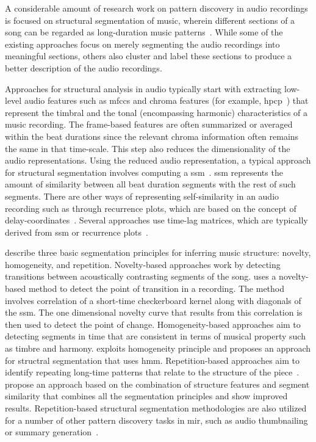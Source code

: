 A considerable amount of research work on pattern discovery in audio recordings is focused on structural segmentation of music, wherein different sections of a song can be regarded as long-duration music patterns~\citep{paulus2010state}. While some of the existing approaches focus on merely segmenting the audio recordings into meaningful sections, others also cluster and label these sections to produce a better description of the audio recordings. 

Approaches for structural analysis in audio typically start with extracting low-level audio features such as \glspl{mfcc} and chroma features (for example, \gls{hpcp}~\citep{gomez2006tonal}) that represent the timbral and the tonal (encompassing harmonic) characteristics of a music recording. The frame-based features are often summarized or averaged within the beat durations since the relevant chroma information often remains the same in that time-scale. This step also reduces the dimensionality of the audio representations. Using the reduced audio representation, a typical approach for structural segmentation involves computing a \gls{ssm}~\citep{foote2000automatic}. \Gls{ssm} represents the amount of similarity between all beat duration segments with the rest of such segments. There are other ways of representing self-similarity in an audio recording such as through recurrence plots, which are based on the concept of delay-coordinates~\citep{serra2014unsupervised}. Several approaches use time-lag matrices, which are typically derived from \gls{ssm} or recurrence plots~\citep{Goto06TASLP}.

\cite{paulus2010state} describe three basic segmentation principles for inferring music structure: novelty, homogeneity, and repetition. Novelty-based approaches work by detecting transitions between acoustically contrasting segments of the song. \cite{foote2000automatic} uses a novelty-based method to detect the point of transition in a recording. The method involves correlation of a short-time checkerboard kernel along with diagonals of the \gls{ssm}. The one dimensional novelty curve that results from this correlation is then used to detect the point of change. Homogeneity-based approaches aim to detecting segments in time that are consistent in terms of musical property such as timbre and harmony. \cite{Levy08TASLP} exploits homogeneity principle and proposes an approach for structral segmentation that uses \acrfull{hmm}. Repetition-based approaches aim to identify repeating long-time patterns that relate to the structure of the piece~\citep{Goto06TASLP,dannenberg2003pattern,muller2006towards}.  \cite{serra2014unsupervised} propose an approach based on the combination of structure features and segment similarity that combines all the segmentation principles and show improved results. Repetition-based structural segmentation methodologies are also utilized for a number of other pattern discovery tasks in \gls{mir}, such as audio thumbnailing or summary generation~\citep{chai2003music,aucouturier2002finding,muller2013robust,nieto2012compressing}. 

